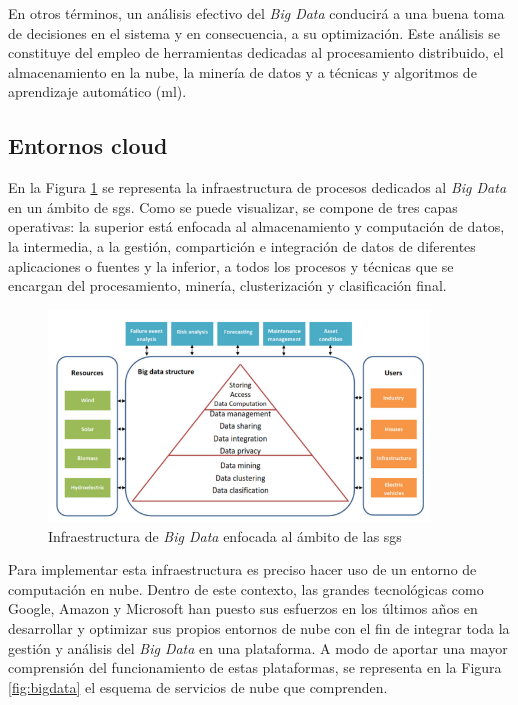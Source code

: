 \vspace{3mm}

En otros términos, un análisis efectivo del \textit{Big Data} conducirá a una buena toma de decisiones en el sistema y en consecuencia, a su optimización. Este análisis se constituye del empleo de herramientas dedicadas al procesamiento distribuido, el almacenamiento en la nube, la minería de datos y a técnicas y algoritmos de aprendizaje automático (\gls{ml}). 

\vspace{3mm}

\subsection{Entornos cloud}

En la Figura \ref{fig:bigdata2} se representa la infraestructura de procesos dedicados al \textit{Big Data} en un ámbito de \gls{sg}s. Como se puede visualizar, se compone de tres capas operativas: la superior está enfocada al almacenamiento y computación de datos, la intermedia, a la gestión, compartición e integración de datos de diferentes aplicaciones o fuentes y la inferior, a todos los procesos y técnicas que se encargan del procesamiento, minería, clusterización y clasificación final. \cite{stab} 

\begin{figure}[h!]
  \centering
  \includegraphics[width=0.9\textwidth]{img/teoria/bigdata2.png}
  \caption{Infraestructura de \textit{Big Data} enfocada al ámbito de las \gls{sg}s \cite{stab}}
  \label{fig:bigdata2}
\end{figure}

Para implementar esta infraestructura es preciso hacer uso de un entorno de computación en nube. Dentro de este contexto, las grandes tecnológicas como Google, Amazon y Microsoft han puesto sus esfuerzos en los últimos años en desarrollar y optimizar sus propios entornos de nube con el fin de integrar toda la gestión y análisis del \textit{Big Data} en una plataforma. A modo de aportar una mayor comprensión del funcionamiento de estas plataformas, se representa en la Figura \ref{fig:bigdata} el esquema de servicios de nube que comprenden.


